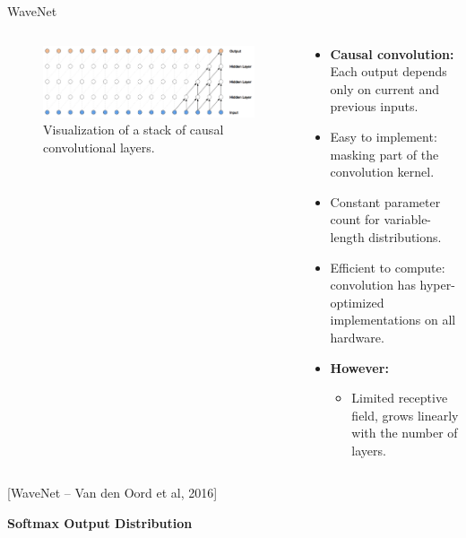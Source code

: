 \begin{frame}[allowframebreaks]{WaveNet}
    \begin{columns}
        \begin{column}{0.6\linewidth}
            \begin{figure}
                \centering
                \includegraphics[width=1\linewidth]{images/autoregressive/casual-convolution.png}
                \caption*{Visualization of a stack of causal convolutional layers.}
            \end{figure}
        \end{column}
        \begin{column}{0.5\linewidth}
            \begin{itemize}
                \item \textbf{Causal convolution:} Each output depends only on current and previous inputs.
                \item Easy to implement: masking part of the convolution kernel.
                \item Constant parameter count for variable-length distributions.
                \item Efficient to compute: convolution has hyper-optimized implementations on all hardware.
                \item[] \textbf{However:}
                \begin{itemize}
                    \item Limited receptive field, grows linearly with the number of layers.
                \end{itemize}
            \end{itemize}
        \end{column}
    \end{columns}
    \small [WaveNet – Van den Oord et al, 2016]

    \framebreak

    \textbf{Softmax Output Distribution}


\end{frame}
